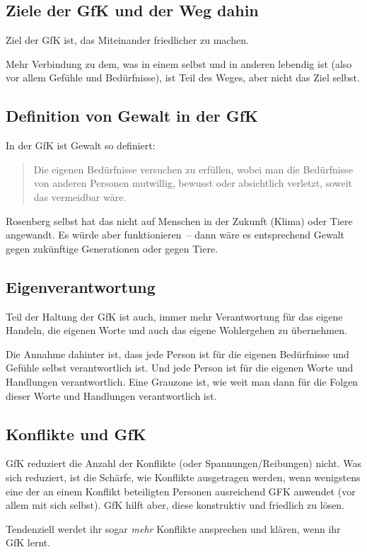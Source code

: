 \subsection{Ziele der GfK und der Weg dahin}
\label{gfk-ziele}

Ziel der GfK ist, das Miteinander friedlicher zu machen.

Mehr Verbindung zu dem, was in einem selbst und in anderen lebendig ist (also vor allem Gefühle und Bedürfnisse), ist Teil des Weges, aber nicht das Ziel selbst.

\subsection{Definition von Gewalt in der GfK}
\label{gewalt-definition}

In der GfK ist Gewalt so definiert:

\begin{quote}
    Die eigenen Bedürfnisse versuchen zu erfüllen, wobei man die Bedürfnisse von anderen Personen mutwillig, bewusst oder absichtlich verletzt, soweit das vermeidbar wäre.
\end{quote}

Rosenberg selbst hat das nicht auf Menschen in der Zukunft (Klima) oder Tiere angewandt. Es würde aber funktionieren~-- dann wäre es entsprechend Gewalt gegen zukünftige Generationen oder gegen Tiere.

\subsection{Eigenverantwortung}
\label{gfk-eigenverantwortung}

Teil der Haltung der GfK ist auch, immer mehr Verantwortung für das eigene Handeln, die eigenen Worte und auch das eigene Wohlergehen zu übernehmen.

Die Annahme dahinter ist, dass jede Person ist für die eigenen Bedürfnisse und Gefühle selbst verantwortlich ist. Und jede Person ist für die eigenen Worte und Handlungen verantwortlich. Eine Grauzone ist, wie weit man dann für die Folgen dieser Worte und Handlungen verantwortlich ist.

\subsection{Konflikte und GfK}
\label{gfk-konflikte}

GfK reduziert die Anzahl der Konflikte (oder Spannungen/Reibungen) nicht. Was sich reduziert, ist die Schärfe, wie Konflikte ausgetragen werden, wenn wenigstens eine der an einem Konflikt beteiligten Personen ausreichend GFK anwendet (vor allem mit sich selbst). GfK hilft aber, diese konstruktiv und friedlich zu lösen.

Tendenziell werdet ihr sogar \emph{mehr} Konflikte ansprechen und klären, wenn ihr GfK lernt.
